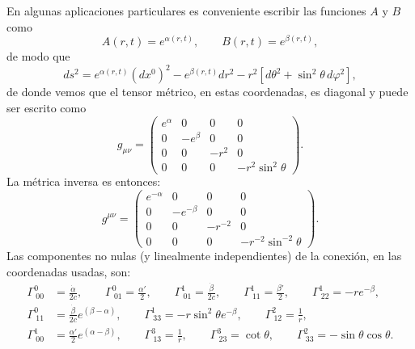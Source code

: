 En algunas aplicaciones particulares es conveniente escribir las funciones
$A$ y $B$ como
\begin{equation}\label{funcionesmetrica}
A(r,t) =e^{\alpha(r,t)}, \qquad B(r,t) =e^{\beta(r,t)},
\end{equation}
de modo que
\begin{equation}\label{ds2_rt}
ds^2=e^{\alpha(r,t)} (dx^0)^2-e^{\beta(r,t)} dr^2-r^2\left[
d\theta^2+\sin^2\theta\, d\varphi^2\right],
\end{equation}
de donde vemos que el tensor métrico, en estas coordenadas, es diagonal y puede
ser escrito como
\begin{equation}
g_{\mu\nu}=%
\begin{pmatrix}
e^\alpha& 0 & 0 & 0\\
0 & -e^\beta & 0 & 0\\
0 & 0 & -r^2 & 0\\
0 & 0 & 0 & -r^2\sin^2\theta
\end{pmatrix}.
\end{equation}
La métrica inversa es entonces:
\begin{equation}
g^{\mu\nu}=%
\begin{pmatrix}
e^{-\alpha} & 0 & 0 & 0\\
0 & -e^{-\beta} & 0 & 0\\
0 & 0 & -r^{-2} & 0\\
0 & 0 & 0 & -r^{-2}\sin^{-2}\theta
\end{pmatrix}.
\end{equation}
Las componentes no nulas (y linealmente independientes) de la conexión, en las
coordenadas usadas, son:
\begin{align}
\Gamma_{\ 00}^0 & =\frac{\dot{\alpha}}{2c}, \qquad
\Gamma_{\ 01}^0 =\frac{\alpha'}{2}, \qquad
\Gamma_{\ 01}^1 =\frac{\dot{\beta}}{2c}, \qquad
\Gamma_{\ 11}^1 =\frac{\beta'}{2}, \qquad
\Gamma_{\ 22}^1 =-re^{-\beta}, \label{gammas1_sch}\\
\Gamma_{\ 11}^0 & =\frac{\dot{\beta}}{2c}e^{(\beta-\alpha)}, \qquad
\Gamma_{\ 33}^1 =-r\sin^2\theta e^{-\beta}, \qquad
\Gamma_{\ 12}^2 =\frac{1}{r},\label{gammas2_sch}\\
\Gamma_{\ 00}^1 & =\frac{\alpha'}{2} e^{(\alpha-\beta)}, \qquad
\Gamma_{\ 13}^3 =\frac{1}{r}, \qquad
\Gamma_{\ 23}^3 =\cot\theta, \qquad
\Gamma_{\ 33}^2 =-\sin\theta\cos\theta .\label{gammas3_sch}
\end{align}

